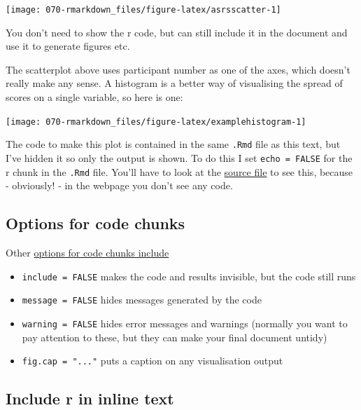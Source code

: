 \documentclass[
]{book}
\providecommand{\tightlist}{%
  \setlength{\itemsep}{0pt}\setlength{\parskip}{0pt}}
\begin{document}
\begin{center}\texttt{[image: 070-rmarkdown\_files/figure-latex/asrsscatter-1]} \end{center}

You don't need to show the r code, but can still include it in the document and use it to generate figures etc.

The scatterplot above uses participant number as one of the axes, which doesn't really make any sense. A histogram is a better way of visualising the spread of scores on a single variable, so here is one:

\begin{center}\texttt{[image: 070-rmarkdown\_files/figure-latex/examplehistogram-1]} \end{center}

The code to make this plot is contained in the same \texttt{.Rmd} file as this text, but I've hidden it so only the output is shown. To do this I set \texttt{echo\ =\ FALSE} for the r chunk in the \texttt{.Rmd} file. You'll have to look at the \href{https://github.com/tomstafford/psy6422/blob/master/070-rmarkdown.Rmd}{source file} to see this, because - obviously! - in the webpage you don't see any code.

\hypertarget{options-for-code-chunks}{%
\subsection{Options for code chunks}\label{options-for-code-chunks}}

Other \href{https://rmarkdown.rstudio.com/lesson-3.html}{options for code chunks include}

\begin{itemize}
\tightlist
\item
  \texttt{include\ =\ FALSE} makes the code and results invisible, but the code still runs
\item
  \texttt{message\ =\ FALSE} hides messages generated by the code
\item
  \texttt{warning\ =\ FALSE} hides error messages and warnings (normally you want to pay attention to these, but they can make your final document untidy)
\item
  \texttt{fig.cap\ =\ "..."} puts a caption on any visualisation output
\end{itemize}

\hypertarget{include-r-in-inline-text}{%
\subsection{Include r in inline text}\label{include-r-in-inline-text}}
\end{document}
